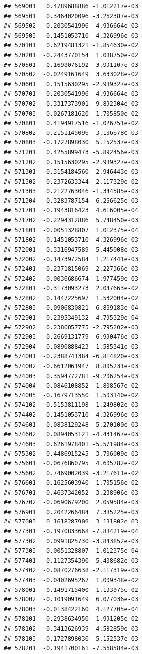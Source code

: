 \documentclass[ignorenonframetext,]{beamer}
\begin{document}
\begin{frame}[fragile]
\begin{verbatim}
## 569001   0.4789688886 -1.012217e-03
## 569501   0.3464020096 -3.262387e-03
## 569502   0.2030541996 -4.936664e-03
## 569503   0.1451053710 -4.326996e-03
## 570101   0.6219481321 -1.854630e-02
## 570201  -0.2443770154  1.088750e-02
## 570501  -0.1698076192  3.991107e-03
## 570502  -0.0249161649  3.633028e-02
## 570601   0.1515630295 -2.989327e-03
## 570701   0.2030541996 -4.936664e-03
## 570702  -0.3317373901  9.892304e-03
## 570703   0.0267181620 -1.705850e-02
## 570801   0.4194917516 -1.026751e-02
## 570802  -0.2151145096  3.106678e-03
## 570803  -0.1727898030  5.152537e-03
## 571201   0.4255899473 -5.892456e-03
## 571202   0.1515630295 -2.989327e-03
## 571301  -0.3154184560  2.946443e-03
## 571302  -0.2372633344  2.117329e-02
## 571303   0.2122763046 -1.344585e-03
## 571304  -0.3283787154  6.266625e-03
## 571701  -0.1943816423  4.616005e-04
## 571702  -0.2294312886  5.748450e-03
## 571801  -0.0051328807  1.012375e-04
## 571802   0.1451053710 -4.326996e-03
## 572001   0.3316947589 -5.445008e-03
## 572002  -0.1473972584  1.217441e-03
## 572401  -0.2371815069  2.227366e-03
## 572402  -0.0036686674  1.977459e-03
## 572801  -0.3173093273  2.047663e-02
## 572802   0.1447225697  1.532004e-02
## 572803   0.0906830821 -6.869183e-04
## 572901   0.2395349132 -4.795329e-04
## 572902   0.2386857775 -2.795202e-03
## 572903  -0.2669131779 -6.990476e-03
## 572904   0.0890888423  1.585341e-03
## 574001  -0.2388741384 -6.814820e-03
## 574002  -0.6612061947  8.805231e-03
## 574003   0.3594772781 -9.206254e-03
## 574004  -0.0846108852 -1.808567e-02
## 574005  -0.1679713550  1.503140e-02
## 574102  -0.5153811198  1.249802e-03
## 574402   0.1451053710 -4.326996e-03
## 574601   0.0838129248  5.270100e-03
## 574602   0.0894053121 -4.431467e-03
## 574603   0.6261978401 -5.571984e-03
## 575302  -0.4486915245  3.706009e-03
## 575601  -0.0676860795  4.605782e-02
## 575602   0.7469002039 -3.217611e-02
## 576601   0.1625603940  1.705156e-02
## 576701   0.4637342052  3.238906e-03
## 576702  -0.0690679200  2.059584e-03
## 576901   0.2042266484  7.385225e-03
## 577003  -0.1618287909  3.191802e-03
## 577301  -0.1970833668 -7.884219e-04
## 577302   0.0991825730 -3.843852e-03
## 577303  -0.0051328807  1.012375e-04
## 577401  -0.1127354390 -5.408682e-03
## 577402  -0.0870276638 -2.117319e-03
## 577403  -0.0402695267  1.009348e-02
## 578001  -0.1491715400 -1.133975e-02
## 578002  -0.1019091649  6.077036e-03
## 578003  -0.0138422160  4.127705e-04
## 578101  -0.2938634950  1.991205e-02
## 578102   0.3413626939 -4.582859e-03
## 578103  -0.1727898030  5.152537e-03
## 578201  -0.1941700161 -7.568584e-03

\end{verbatim}
\end{frame}
\end{document}
